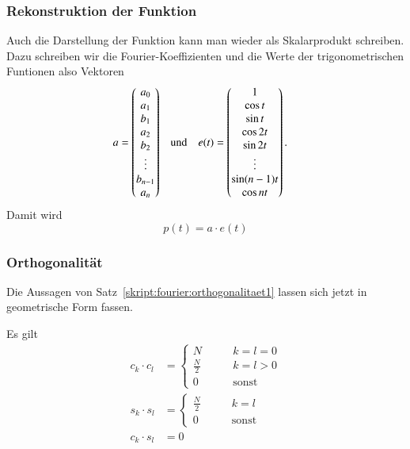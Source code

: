 \subsubsection{Rekonstruktion der Funktion}
Auch die Darstellung der Funktion kann man wieder als Skalarprodukt schreiben.
Dazu schreiben wir die Fourier-Koeffizienten und die Werte der
trigonometrischen Funtionen also Vektoren
\begin{align*}
a
&=
\begin{pmatrix}
a_0\mathstrut\\
a_1\mathstrut\\
b_1\mathstrut\\
a_2\mathstrut\\
b_2\mathstrut\\
\vdots\\
b_{n-1}\mathstrut\\
a_n\mathstrut
\end{pmatrix}
&&\text{und}
&
e(t)
&=
\begin{pmatrix}
1\\
\cos t\\
\sin t\\
\cos2t\\
\sin2t\\
\vdots\\
\sin(n-1)t\\
\cos nt
\end{pmatrix}.
\end{align*}
Damit wird 
\[
p(t) = a\cdot e(t)
\]

\subsubsection{Orthogonalität}
Die Aussagen von Satz~\ref{skript:fourier:orthogonalitaet1}
lassen sich jetzt in geometrische Form fassen.
\begin{satz}
Es gilt
\begin{align*}
c_k\cdot c_l
&=
\begin{cases}
N&\qquad k=l=0\\
\displaystyle\frac{N}2&\qquad k=l>0\\
0&\qquad\text{sonst}
\end{cases}
\\
s_k\cdot s_l
&=
\begin{cases}
\displaystyle\frac{N}2&\qquad k=l\\
0&\qquad\text{sonst}
\end{cases}
\\
c_k\cdot s_l
&=
0
\end{align*}
\label{skript:fourier:orthogonalitaet}
\end{satz}

